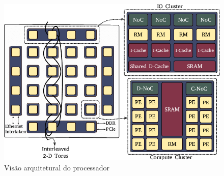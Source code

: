 \begin{figure}[bt]
    \centering
    \includegraphics[width=0.9\linewidth]{content/images/arch-mppa.png}
    \caption{Visão arquitetural do processador \mppa \cite{penna:sbesc19}}\label{fig.arch-mppa}
\end{figure}

